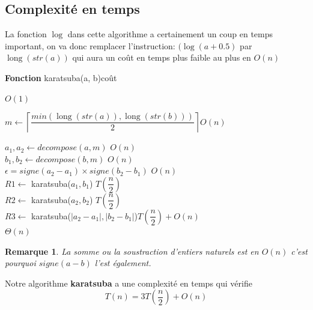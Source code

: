 \documentclass[11pt,french]{article}
\theoremstyle{plain}
\newtheorem*{remarque}{Remarque}
\DeclareMathOperator{\lgd}{long}
\newcommand{\x}{\times}
\begin{document}
\subsection{Complexité en temps}

La fonction $\log$ dans cette algorithme a certainement un coup en temps important, on va donc remplacer l'instruction:
  $( \log(a+0.5)$ par  $ \lgd(str(a))$  qui aura un coût en temps plus faible au plus en $O(n)$
  \medskip

\begin{minipage}{14.5cm}
    \begin{algorithm}[H]
        \caption{\textbf{Fonction} karatsuba(a, b)\hfill coût}
               \hfill $O(1)$
    
        \vspace{1em}
        
        $m  \gets  \left\lceil \dfrac{min\left( \lgd(str(a)), \lgd(str(b))\right) }{2}  \right\rceil$\hfill $O(n)$
        
        $a_1,a_2 \gets decompose(a, m)$ \hfill $O(n)$\\
        $b_1, b_2 \gets  decompose(b, m)$ \hfill $O(n)$\\
        
        $\epsilon = signe(a_2-a_1)\x signe(b_2-b_1)$ \hfill $O(n)$\\
        $R1  \gets $ karatsuba($a_1,b_1$) \hfill $T\left( \dfrac{n}{2}\right) $\\
        $R2 \gets  $ karatsuba($a_2,b_2$) \hfill $T\left( \dfrac{n}{2}\right) $\\
        $R3  \gets $ karatsuba($|a_2-a_1|,|b_2-b_1|$)\hfill $T\left( \dfrac{n}{2}\right) +O(n)$\\
        
        
        \Retour{ $R1 \times 10 ^ {2\times m } + (R1+R2-\epsilon \x R3 ) \times 10 ^{ m} + R2$} \hfill $\Theta(n)$ 
        
    \end{algorithm}

\end{minipage}
\begin{remarque}
La somme ou la soustraction d'entiers naturels est en $O(n)$ c'est pourquoi $signe(a-b)$ l'est également. 
\end{remarque}
\begin{propriete}
    Notre algorithme \textbf{karatsuba} a une complexité en temps qui vérifie \[  T(n)=3T\left( \dfrac{n}{2}\right) +O(n)  \]
 \end{propriete}
\end{document}
